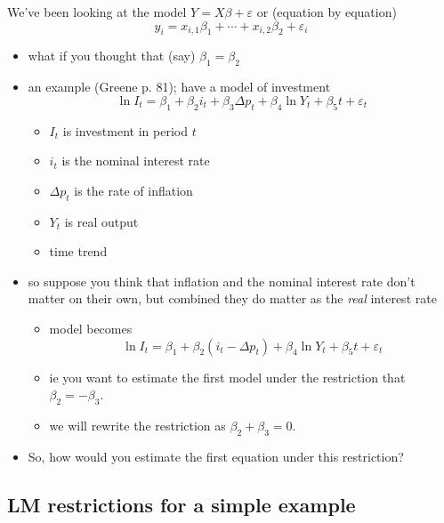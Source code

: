     We've been looking at the model $Y = X\beta + \varepsilon$ or
    (equation by equation) \[ y_i = x_{i,1} \beta_1 + \cdots +
    x_{i,2} \beta_2 + \varepsilon_i \]
\begin{itemize}
\item what if you thought that (say) $\beta_1 = \beta_2$
\item an example (Greene p. 81); have a model of investment \[ \ln I_t
      = \beta_1 + \beta_2 i_t + \beta_3 \Delta p_t + \beta_4 \ln Y_t +
      \beta_5 t + \varepsilon_t \]
\begin{itemize}
\item $I_t$ is investment in period $t$
\item $i_t$ is the nominal interest rate
\item $\Delta p_t$ is the rate of inflation
\item $Y_t$ is real output
\item time trend
\end{itemize}
\item so suppose you think that inflation and the nominal interest rate
      don't matter on their own, but combined they do matter as the
      \emph{real} interest rate
\begin{itemize}
\item model becomes
        \[ \ln I_t = \beta_1 + \beta_2 (i_t - \Delta p_t) + \beta_4 \ln
        Y_t + \beta_5 t + \varepsilon_t \]
\item ie you want to estimate the first model under the restriction
        that $\beta_2 = - \beta_3$.
\item we will rewrite the restriction as $\beta_2 + \beta_3 = 0$.
\end{itemize}
\item So, how would you estimate the first equation under this
      restriction?
\end{itemize}
\subsection{LM restrictions for a simple example}
\label{sec-1-2}

